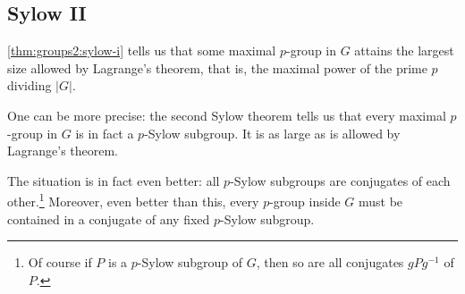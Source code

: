 \subsection{Sylow II}
\label{subsec:groups2:sylow-ii}
\cref{thm:groups2:sylow-i} tells us that some maximal $p$-group in $G$
attains the largest size allowed by Lagrange's theorem, that is, the
maximal power of the prime $p$ dividing $|G|$.

One can be more precise: the second Sylow theorem tells us that every
maximal $p$-group in $G$ is in fact a $p$-Sylow subgroup. It is as
large as is allowed by Lagrange's theorem.

The situation is in fact even better: all $p$-Sylow subgroups are
conjugates of each other.\footnote{Of course if $P$ is a $p$-Sylow
  subgroup of $G$, then so are all conjugates $gPg^{-1}$ of $P$.}
Moreover, even better than this, every $p$-group inside $G$ must be
contained in a conjugate of any fixed $p$-Sylow subgroup.

